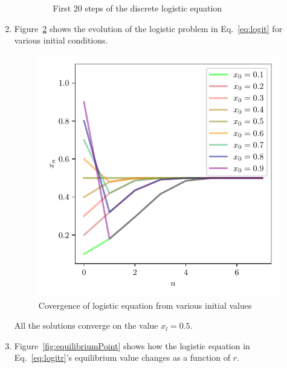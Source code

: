 \documentclass[12pt,a4]{article}
\begin{document}
\begin{enumerate}
\begin{enumerate}
\begin{figure}[H]
          \caption{First 20 steps of the discrete logistic equation}
          \label{fig:first20}
        \end{figure}
    \end{enumerate}
  \item
    Figure~\ref{fig:multipleConvergences} shows the evolution of the logistic problem in Eq.~\ref{eq:logit} for various initial conditions.

    \begin{figure}[H]
      \centering
      \includegraphics[scale = 0.8]{../figs/multipleConvergences.pdf}
      \caption{Covergence of logistic equation from various initial values}
      \label{fig:multipleConvergences}
    \end{figure}

    All the solutions converge on the value $x_l = 0.5$.

  \item
    Figure~\ref{fig:equilibriumPoint} shows how the logistic equation in Eq.~\ref{eq:logitr}'s equilibrium value changes as a function of $r$.


\end{enumerate}
\end{document}
